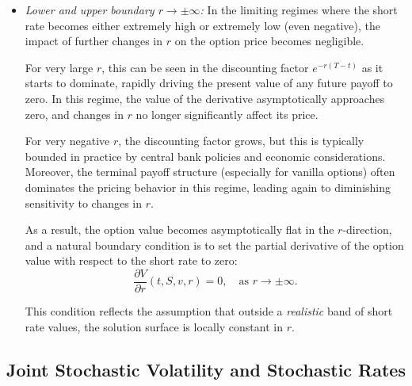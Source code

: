 \documentclass[12pt]{report} %
\theoremstyle{plain} %
\theoremstyle{definition} %
\theoremstyle{remark} %
\begin{document}
\begin{itemize}
    \item \textit{Lower and upper boundary \( r \to \pm\infty \):} 
    In the limiting regimes where the short rate becomes either 
	extremely high or extremely low (even negative), the impact 
	of further changes in \( r \) on the option price becomes 
	negligible. 
	
	For very large \( r \), this can be seen in the discounting 
	factor \( e^{-r(T - t)} \) as it starts to dominate, rapidly driving the 
	present value of any future payoff to zero. In this regime, 
	the value of the derivative asymptotically approaches zero, 
	and changes in \( r \) no longer significantly affect its price.
	
	For very negative \( r \), the discounting factor grows, 
	but this is typically bounded in practice by central bank 
	policies and economic considerations. Moreover, the terminal 
	payoff structure (especially for vanilla options) often dominates 
	the pricing behavior in this regime, leading again to diminishing 
	sensitivity to changes in \( r \).
    
    As a result, the option value becomes asymptotically 
	flat in the \( r \)-direction, and a natural boundary condition 
	is to set the partial derivative of the option value with respect 
	to the short rate to zero:
    \[
        \frac{\partial V}{\partial r}(t, S, v, r) = 0,
        \quad \text{as } r \to \pm\infty.
    \]

    This condition reflects the assumption that 
	outside a \textit{realistic} band of short rate values, the solution 
	surface is locally constant in \( r \).
\end{itemize}


\subsection{Joint Stochastic Volatility and Stochastic Rates}\label{sec:sv_rates}
\end{document}
